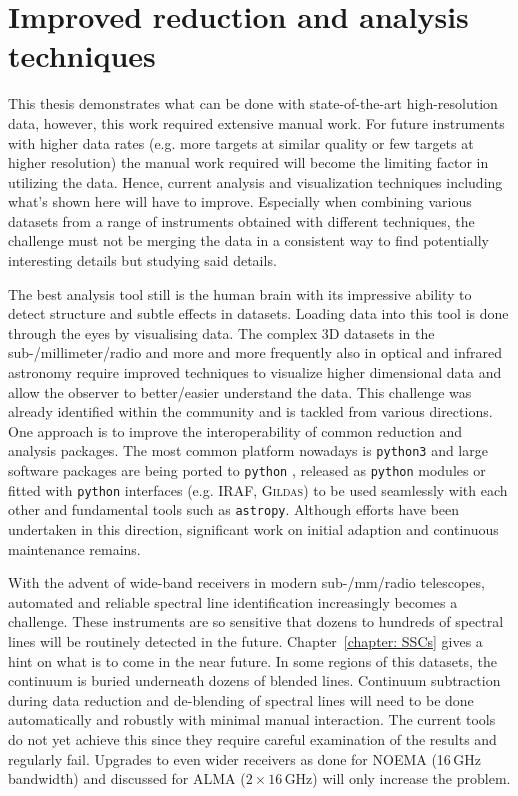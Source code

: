 
\section{Improved reduction and analysis techniques}
\label{discussion: section: analysis techniques}

This thesis demonstrates what can be done with state-of-the-art high-resolution data, however, this work required extensive manual work. For future instruments with higher data rates (e.g. more targets at similar quality or few targets at higher resolution) the manual work required will become the limiting factor in utilizing the data. Hence, current analysis and visualization techniques including what's shown here will have to improve. Especially when combining various datasets from a range of instruments obtained with different techniques, the challenge must not be merging the data in a consistent way to find potentially interesting details but studying said details.

The best analysis tool still is the human brain with its impressive ability to detect structure and subtle effects in datasets. Loading data into this tool is done through the eyes by visualising data. The complex 3D datasets in the sub-/millimeter/radio and more and more frequently also in optical and infrared astronomy require improved techniques to visualize higher dimensional data and allow the observer to better/easier understand the data.
This challenge was already identified within the community and is tackled from various directions. One approach is to improve the interoperability of common reduction and analysis packages. The most common platform nowadays is \texttt{python3} and large software packages are being ported to \texttt{python} \citep[e.g. SCOUSE;][]{2016MNRAS.457.2675H}, released as \texttt{python} modules \citep[e.g. \textsc{CASA};][]{McMullin:2007tj} or fitted with \texttt{python} interfaces (e.g. \textsc{IRAF}, \textsc{Gildas}) to be used seamlessly with each other and fundamental tools such as \texttt{astropy}. Although efforts have been undertaken in this direction, significant work on initial adaption and continuous maintenance remains.

With the advent of wide-band receivers in modern sub-/mm/radio telescopes, automated and reliable spectral line identification increasingly becomes a challenge. These instruments are so sensitive that dozens to hundreds of spectral lines will be routinely detected in the future. Chapter~\ref{chapter: SSCs} gives a hint on what is to come in the near future. In some regions of this datasets, the continuum is buried underneath dozens of blended lines. Continuum subtraction during data reduction and de-blending of spectral lines will need to be done automatically and robustly with minimal manual interaction. The current tools do not yet achieve this since they require careful examination of the results and regularly fail. Upgrades to even wider receivers as done for NOEMA (16\,GHz bandwidth) and discussed for ALMA ($2\times16$\,GHz) will only increase the problem.

